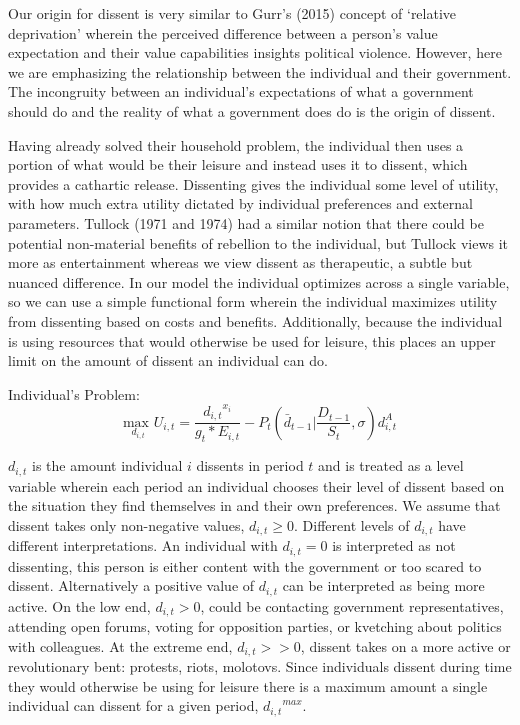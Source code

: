 \documentclass[12pt]{article}
\begin{document}
\begin{spacing}{1.5}
Our origin for dissent is very similar to Gurr's (2015) concept of `relative deprivation' wherein the perceived difference between a person's value expectation and their value capabilities insights political violence. However, here we are emphasizing the relationship between the individual and their government. The incongruity between an individual's expectations of what a government should do and the reality of what a government does do is the origin of dissent.

Having already solved their household problem, the individual then uses a portion of what would be their leisure and instead uses it to dissent, which provides a cathartic release. Dissenting gives the individual some level of utility, with how much extra utility dictated by individual preferences and external parameters. Tullock (1971 and 1974) had a similar notion that there could be potential non-material benefits of rebellion to the individual, but Tullock views it more as entertainment whereas we view dissent as therapeutic, a subtle but nuanced difference. In our model the individual optimizes across a single variable, so we can use a simple functional form wherein the individual maximizes utility from dissenting based on costs and benefits. Additionally, because the individual is using resources that would otherwise be used for leisure, this places an upper limit on the amount of dissent an individual can do. 

\vspace{.5 em}
\noindent Individual's Problem:
\begin{equation}
{\underset{d_{i,t}}{\text{max }}}  U_{i,t}= \frac{{d_{i,t}}^{{x}_i}}{g_t * E_{i,t}} - P_t \left( \bar{d}_{t-1} \Bigg|\frac{D_{t-1}}{S_t},\sigma \right)d_{i,t}^A
\end{equation}

$ d_{i,t} $ is the amount individual $i$ dissents in period $t$ and is treated as a level variable wherein each period an individual chooses their level of dissent based on the situation they find themselves in and their own preferences. We assume that dissent takes only non-negative values, $d_{i,t}\geq0$. Different levels of $d_{i,t}$ have different interpretations. An individual with $d_{i,t}=0$ is interpreted as not dissenting, this person is either content with the government or too scared to dissent. Alternatively a positive value of $d_{i,t}$ can be interpreted as being more active. On the low end, $d_{i,t}>0$, could be contacting government representatives, attending open forums, voting for opposition parties, or kvetching about politics with colleagues. At the extreme end, $d_{i,t}>>0$, dissent takes on a more active or revolutionary bent: protests, riots, molotovs. Since individuals dissent during time they would otherwise be using for leisure there is a maximum amount a single individual can dissent for a given period, ${d_{i,t}}^{max}$. 


\end{spacing}
\end{document}
